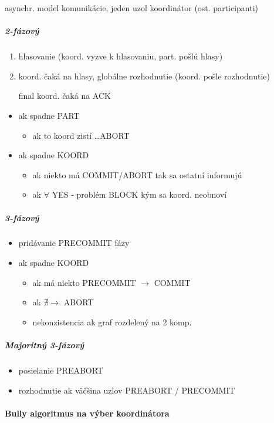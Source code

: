 \documentclass[a4paper]{report}
\begin{document}
\noindent
asynchr. model komunikácie, jeden uzol koordinátor (ost. participanti)

\subparagraph*{2-fázový}
\begin{enumerate}
 \item hlasovanie (koord. vyzve k hlasovaniu, part. pošlú hlasy)
 \item koord. čaká na hlasy, globálne rozhodnutie (koord. pošle rozhodnutie)
 \item[final] koord. čaká na ACK
\end{enumerate}

\begin{itemize}
 \item ak spadne PART
 \begin{itemize}
  \item ak to koord zistí \ldots ABORT
 \end{itemize}
 \item ak spadne KOORD
 \begin{itemize}
  \item ak niekto má COMMIT/ABORT tak sa ostatní informujú
  \item ak $\forall$ YES - problém BLOCK kým sa koord. neobnoví
 \end{itemize}
\end{itemize}

\subparagraph*{3-fázový}
\begin{itemize}
 \item pridávanie PRECOMMIT fázy
 \item ak spadne KOORD
 \begin{itemize}
  \item ak má niekto PRECOMMIT $\rightarrow$ COMMIT
  \item ak $\nexists \rightarrow$ ABORT
  \item nekonzistencia ak graf rozdelený na 2 komp.
 \end{itemize}
\end{itemize}

\subparagraph*{Majoritný 3-fázový}
\begin{itemize}
 \item posielanie PREABORT
 \item rozhodnutie ak väčšina uzlov PREABORT / PRECOMMIT
\end{itemize}

\paragraph{Bully algoritmus na výber koordinátora}
\end{document}
